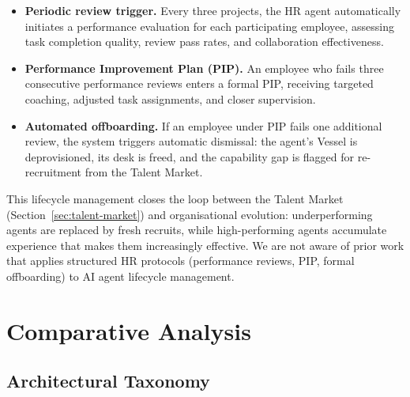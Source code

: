 \documentclass[11pt,a4paper]{article}
\begin{document}
\begin{itemize}[nosep]
    \item \textbf{Periodic review trigger.}  Every three projects, the HR agent automatically initiates a performance evaluation for each participating employee, assessing task completion quality, review pass rates, and collaboration effectiveness.
    \item \textbf{Performance Improvement Plan (PIP).}  An employee who fails three consecutive performance reviews enters a formal PIP, receiving targeted coaching, adjusted task assignments, and closer supervision.
    \item \textbf{Automated offboarding.}  If an employee under PIP fails one additional review, the system triggers automatic dismissal: the agent's Vessel is deprovisioned, its desk is freed, and the capability gap is flagged for re-recruitment from the Talent Market.
\end{itemize}

This lifecycle management closes the loop between the Talent Market (Section~\ref{sec:talent-market}) and organisational evolution: underperforming agents are replaced by fresh recruits, while high-performing agents accumulate experience that makes them increasingly effective.  We are not aware of prior work that applies structured HR protocols (performance reviews, PIP, formal offboarding) to AI agent lifecycle management.


\section{Comparative Analysis}
\label{sec:comparison}

\subsection{Architectural Taxonomy}
\end{document}
